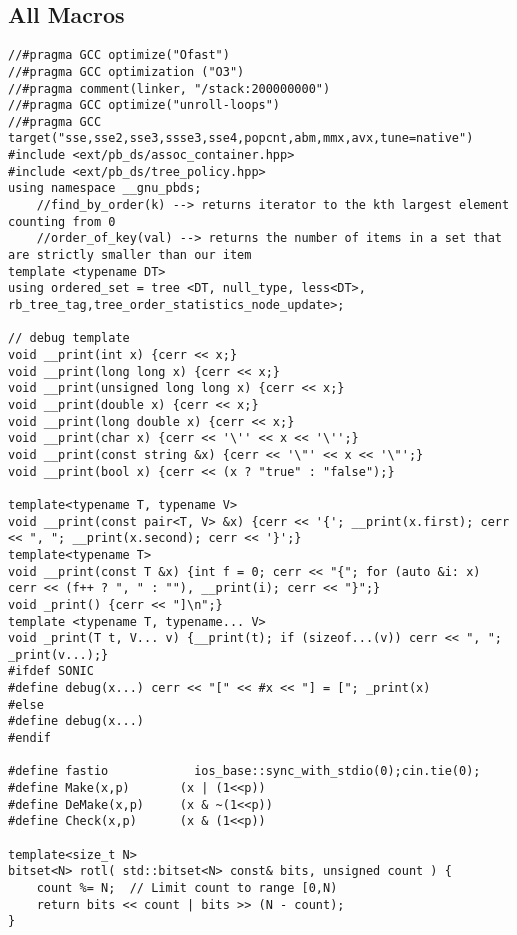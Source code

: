 \documentclass[FSZ,a4paper,onesided]{article}
\begin{document}
\begin{multicols*}{\COLS}
\tableofcontents
\newpage
{}


\section{All Macros}
\begin{lstlisting}
//#pragma GCC optimize("Ofast")
//#pragma GCC optimization ("O3")
//#pragma comment(linker, "/stack:200000000")
//#pragma GCC optimize("unroll-loops")
//#pragma GCC target("sse,sse2,sse3,ssse3,sse4,popcnt,abm,mmx,avx,tune=native")
#include <ext/pb_ds/assoc_container.hpp>
#include <ext/pb_ds/tree_policy.hpp>
using namespace __gnu_pbds;
    //find_by_order(k) --> returns iterator to the kth largest element counting from 0
    //order_of_key(val) --> returns the number of items in a set that are strictly smaller than our item
template <typename DT> 
using ordered_set = tree <DT, null_type, less<DT>, rb_tree_tag,tree_order_statistics_node_update>;

// debug template
void __print(int x) {cerr << x;}
void __print(long long x) {cerr << x;}
void __print(unsigned long long x) {cerr << x;}
void __print(double x) {cerr << x;}
void __print(long double x) {cerr << x;}
void __print(char x) {cerr << '\'' << x << '\'';}
void __print(const string &x) {cerr << '\"' << x << '\"';}
void __print(bool x) {cerr << (x ? "true" : "false");}

template<typename T, typename V>
void __print(const pair<T, V> &x) {cerr << '{'; __print(x.first); cerr << ", "; __print(x.second); cerr << '}';}
template<typename T>
void __print(const T &x) {int f = 0; cerr << "{"; for (auto &i: x) cerr << (f++ ? ", " : ""), __print(i); cerr << "}";}
void _print() {cerr << "]\n";}
template <typename T, typename... V>
void _print(T t, V... v) {__print(t); if (sizeof...(v)) cerr << ", "; _print(v...);}
#ifdef SONIC
#define debug(x...) cerr << "[" << #x << "] = ["; _print(x)
#else
#define debug(x...)
#endif

#define fastio            ios_base::sync_with_stdio(0);cin.tie(0);
#define Make(x,p)       (x | (1<<p))
#define DeMake(x,p)     (x & ~(1<<p))
#define Check(x,p)      (x & (1<<p))

template<size_t N>
bitset<N> rotl( std::bitset<N> const& bits, unsigned count ) {
    count %= N;  // Limit count to range [0,N)
    return bits << count | bits >> (N - count);
}\end{lstlisting}

\end{multicols*}
\end{document}
